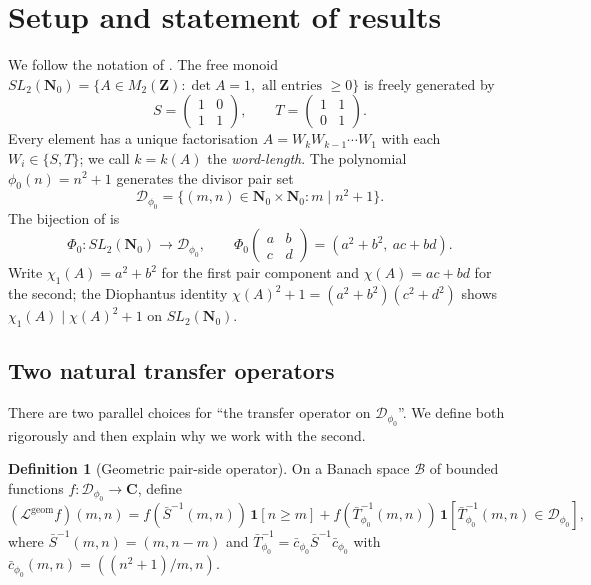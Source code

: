 ﻿\documentclass[11pt]{article}
\theoremstyle{definition}
\newtheorem{definition}[theorem]{Definition}
\newcommand{\Nz}{\mathbf{N}_0}
\newcommand{\Z}{\mathbf{Z}}
\newcommand{\C}{\mathbf{C}}
\newcommand{\SLNz}{SL_2(\Nz)}
\newcommand{\Dphi}{\mathcal{D}_{\phi_0}}
\newcommand{\Sb}{\bar{S}}
\newcommand{\Tb}{\bar{T}_{\phi_0}}
\newcommand{\cb}{\bar{c}_{\phi_0}}
\newcommand{\Phio}{\Phi_0}
\newcommand{\Lop}{\mathcal{L}}
\newcommand{\chiA}{\chi}
\begin{document}
\tableofcontents

\section{Setup and statement of results}\label{sec:setup}

We follow the notation of \cite{shakov2024}. The free monoid $\SLNz=\{A\in M_2(\Z): \det A=1, \text{ all entries }\ge 0\}$ is freely generated by
\[
S = \begin{pmatrix}1 & 0 \\ 1 & 1\end{pmatrix},\qquad T=\begin{pmatrix}1 & 1 \\ 0 & 1\end{pmatrix}.
\]
Every element has a unique factorisation $A=W_k W_{k-1}\cdots W_1$ with each $W_i\in\{S,T\}$; we call $k=k(A)$ the \emph{word-length}. The polynomial $\phi_0(n)=n^2+1$ generates the divisor pair set
\[
\Dphi = \{(m,n)\in\Nz\times\Nz : m\mid n^2+1\}.
\]
The bijection of \cite[\S2]{shakov2024} is
\begin{equation}\label{eq:phi0}
\Phio:\SLNz\to\Dphi,\qquad
\Phio\!\begin{pmatrix}a&b\\c&d\end{pmatrix}=(a^2+b^2,\ ac+bd).
\end{equation}
Write $\chi_1(A)=a^2+b^2$ for the first pair component and $\chiA(A)=ac+bd$ for the second; the Diophantus identity $\chiA(A)^2+1=(a^2+b^2)(c^2+d^2)$ shows $\chi_1(A)\mid \chiA(A)^2+1$ on $\SLNz$.

\subsection{Two natural transfer operators}

There are two parallel choices for ``the transfer operator on $\Dphi$''. We define both rigorously and then explain why we work with the second.

\begin{definition}[Geometric pair-side operator]\label{def:Lpair}
On a Banach space $\mathcal{B}$ of bounded functions $f:\Dphi\to\C$, define
\[
(\Lop^{\mathrm{geom}} f)(m,n) = f(\Sb^{-1}(m,n))\,\mathbf{1}[n\ge m] + f(\Tb^{-1}(m,n))\,\mathbf{1}[\Tb^{-1}(m,n)\in\Dphi],
\]
where $\Sb^{-1}(m,n)=(m,n-m)$ and $\Tb^{-1}=\cb\Sb^{-1}\cb$ with $\cb(m,n)=((n^2+1)/m,n)$.
\end{definition}
\end{document}
